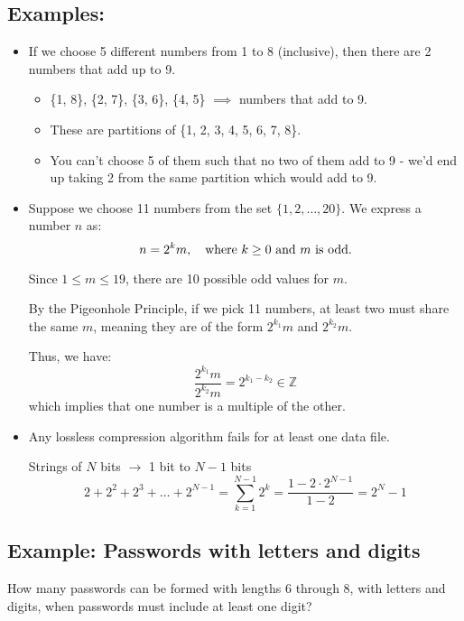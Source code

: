 \documentclass[11pt]{article}
\begin{document}
\subsection*{Examples:}
\begin{itemize}
    \item If we choose 5 different numbers from 1 to 8 (inclusive), then there are 2 numbers that add up to 9.

    \begin{itemize}
        \item \{1, 8\}, \{2, 7\}, \{3, 6\}, \{4, 5\} $\implies$ numbers that add to 9.
        \item These are partitions of \{1, 2, 3, 4, 5, 6, 7, 8\}.
        \item You can't choose 5 of them such that no two of them add to 9 - we'd end up taking 2 from the same partition which would add to 9.
    \end{itemize}

    \item Suppose we choose 11 numbers from the set $ \{1,2,\dots,20\} $.  
    We express a number $ n $ as:
    \[
    n = 2^k m, \quad \text{where $ k \geq 0 $ and $ m $ is odd.}
    \]
    
    Since $ 1 \leq m \leq 19 $, there are 10 possible odd values for $ m $.  
    
    By the Pigeonhole Principle, if we pick 11 numbers, at least two must share the same $ m $, meaning they are of the form $ 2^{k_1} m $ and $ 2^{k_2} m $.  
    
    Thus, we have:
    \[
    \frac{2^{k_1} m}{2^{k_2} m} = 2^{k_1 - k_2} \in \mathbb{Z}
    \]
    which implies that one number is a multiple of the other.

    \item Any lossless compression algorithm fails for at least one data file.

    Strings of $ N $ bits $ \rightarrow $ 1 bit to $N - 1$ bits
    \[
    2 + 2^2 + 2^3 + \ldots + 2^{N-1}
    = \sum_{k=1}^{N-1} 2^k = \frac{1 - 2 \cdot 2^{N-1}}{1 - 2} = 2^N - 1
    \]
\end{itemize}

\subsection*{Example: Passwords with letters and digits}
How many passwords can be formed with lengths 6 through 8, with letters and digits, when passwords must include at least one digit?
\end{document}
